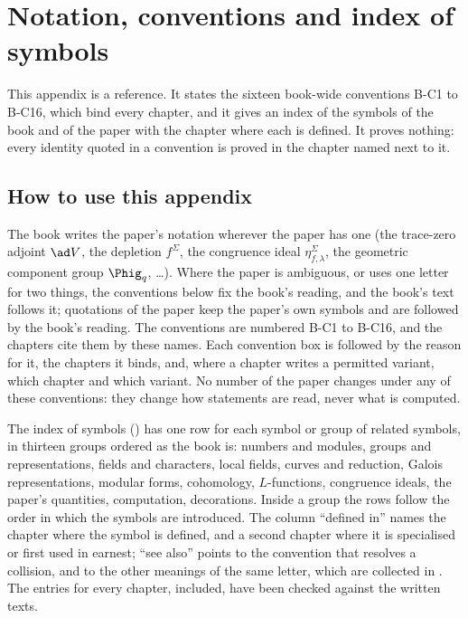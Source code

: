 \chapter{Notation, conventions and index of symbols}\label{ch:notation}

This appendix is a reference. It states the sixteen book-wide conventions B-C1 to B-C16, which bind every chapter, and it
gives an index of the symbols of the book and of the paper with the chapter where each is defined. It proves nothing: every
identity quoted in a convention is proved in the chapter named next to it.

\section{How to use this appendix}\label{sec:notation:use}

The book writes the paper's notation wherever the paper has one (the trace-zero adjoint $\ad V$, the depletion $f^\Sigma$,
the congruence ideal $\eta^\Sigma_{f,\lambda}$, the geometric component group $\Phig_q$, \dots). Where the paper is ambiguous, or
uses one letter for two things, the conventions below fix the book's reading, and the book's text follows it; quotations of the
paper keep the paper's own symbols and are followed by the book's reading. The conventions are numbered B-C1 to B-C16, and the
chapters cite them by these names. Each convention box is followed by the reason for it, the chapters it binds, and, where a
chapter writes a permitted variant, which chapter and which variant. No number of the paper changes under any of these
conventions: they change how statements are read, never what is computed.

The index of symbols () has one row for each symbol or group of related symbols, in thirteen groups
ordered as the book is: numbers and modules, groups and representations, fields and characters, local fields, curves and
reduction, Galois representations, modular forms, cohomology, $L$-functions, congruence ideals, the paper's quantities,
computation, decorations. Inside a group the rows follow the order in which the symbols are introduced. The column
``defined in'' names the chapter where the symbol is defined, and a second chapter where it is specialised or first used in
earnest; ``see also'' points to the convention that resolves a collision, and to the other meanings of the same letter, which
are collected in . The entries for every chapter,  included, have been checked
against the written texts.

